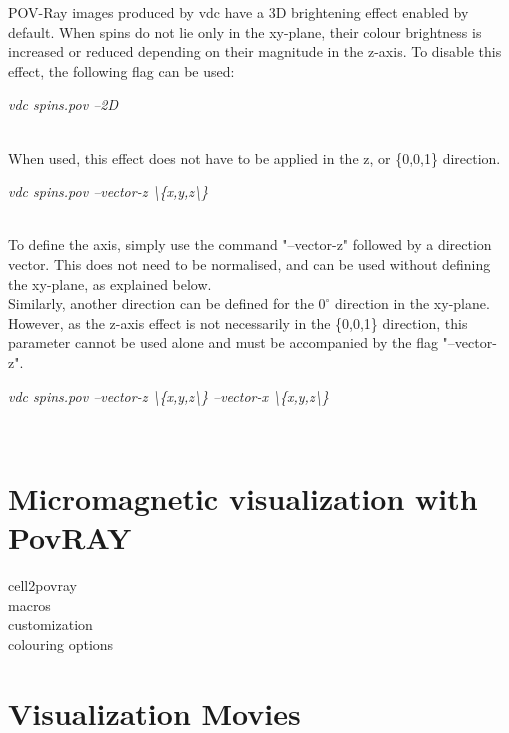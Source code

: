 POV-Ray images produced by vdc have a 3D brightening effect enabled by default. When spins do not lie only in the xy-plane, their colour brightness is increased or reduced depending on their magnitude in the z-axis. To disable this effect, the following flag can be used:

\begin{minipage}[c]{\textwidth}
\centering
\textit{vdc spins.pov --2D}
\end{minipage}\\

When used, this effect does not have to be applied in the z, or \{0,0,1\} direction.

\begin{minipage}[c]{\textwidth}
\centering
\textit{vdc spins.pov --vector-z \textbackslash\{x,y,z\textbackslash\}}
\end{minipage}\\

To define the axis, simply use the command "--vector-z" followed by a direction vector. This does not need to be normalised, and can be used without defining the xy-plane, as explained below.\\

Similarly, another direction can be defined for the $0^{\circ}$ direction in the xy-plane. However, as the z-axis effect is not necessarily in the \{0,0,1\} direction, this parameter cannot be used alone and must be accompanied by the flag "--vector-z".

\begin{minipage}[c]{\textwidth}
\centering
\textit{vdc spins.pov --vector-z \textbackslash\{x,y,z\textbackslash\} --vector-x \textbackslash\{x,y,z\textbackslash\}}
\end{minipage}\\

\section*{Micromagnetic visualization with PovRAY}
cell2povray\\
macros\\
customization\\
colouring options\\

\section*{Visualization Movies}
